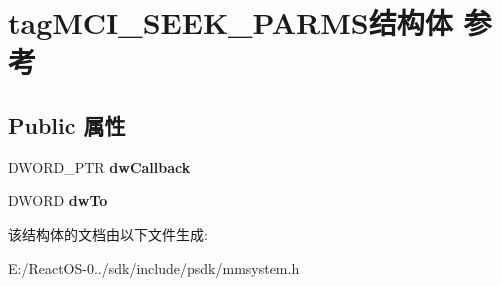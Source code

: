\hypertarget{structtag_m_c_i___s_e_e_k___p_a_r_m_s}{}\section{tag\+M\+C\+I\+\_\+\+S\+E\+E\+K\+\_\+\+P\+A\+R\+M\+S结构体 参考}
\label{structtag_m_c_i___s_e_e_k___p_a_r_m_s}
\subsection*{Public 属性}
\begin{DoxyCompactItemize}
\item 
\mbox{\label{structtag_m_c_i___s_e_e_k___p_a_r_m_s_ab5dbb415483893375de6f112f946f5c4}} 
D\+W\+O\+R\+D\+\_\+\+P\+TR {\bfseries dw\+Callback}
\item 
\mbox{\label{structtag_m_c_i___s_e_e_k___p_a_r_m_s_a445b4f92d343af56142171d9207522fe}} 
D\+W\+O\+RD {\bfseries dw\+To}
\end{DoxyCompactItemize}


该结构体的文档由以下文件生成\+:\begin{DoxyCompactItemize}
\item 
E\+:/\+React\+O\+S-\/0../sdk/include/psdk/mmsystem.\+h\end{DoxyCompactItemize}
